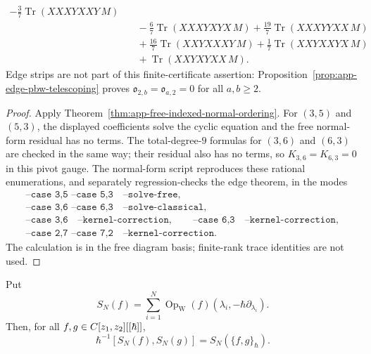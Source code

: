 \begin{prop}
\[\begin{aligned}
      -\frac{3}{7}\operatorname{Tr}(XXXYXXY\,M)\\
    &\quad
      -\frac{6}{7}\operatorname{Tr}(XXXYXYX\,M)
      +\frac{19}{7}\operatorname{Tr}(XXXYYXX\,M)\\
    &\quad
      +\frac{16}{7}\operatorname{Tr}(XXYXXXY\,M)
      +\frac{1}{7}\operatorname{Tr}(XXYXXYX\,M)\\
    &\quad
      +\operatorname{Tr}(XXYXYXX\,M).
  \end{aligned}
  \]
  Edge strips are not part of this finite-certificate assertion:
  Proposition~\ref{prop:app-edge-pbw-telescoping} proves
  \(\mathfrak o_{2,b}=\mathfrak o_{a,2}=0\) for all \(a,b\geq2\).
\end{prop}

\begin{proof}
  Apply Theorem~\ref{thm:app-free-indexed-normal-ordering}.  For
  \((3,5)\) and \((5,3)\), the displayed coefficients solve the cyclic
  equation and the free normal-form residual has no terms.  The
  total-degree-\(9\) formulas for \((3,6)\) and \((6,3)\) are checked in
  the same way; their residual also has no terms, so \(K_{3,6}=K_{6,3}=0\)
  in this pivot gauge.  The normal-form script reproduces these
  rational enumerations, and separately regression-checks the edge
  theorem, in the modes
  \[
  \begin{gathered}
    \texttt{--case 3,5 --case 5,3}\quad \texttt{--solve-free},\\
    \texttt{--case 3,6 --case 6,3}\quad
      \texttt{--solve-classical},\\
    \texttt{--case 3,6}\quad \texttt{--kernel-correction},\qquad
    \texttt{--case 6,3}\quad \texttt{--kernel-correction},\\
    \texttt{--case 2,7 --case 7,2}\quad
      \texttt{--kernel-correction}.
  \end{gathered}
  \]
  The calculation is in the free diagram basis; finite-rank trace
  identities are not used.
\end{proof}

\begin{lem}
\label{lem:app-radial-cartan-moyal-representation}
  Put
  \[
    S_N(f)=\sum_{i=1}^N
      \operatorname{Op}_{\mathrm W}
      (f)(\lambda_i,-\hbar\partial_{\lambda_i}).
  \]
  Then, for all \(f,g\in C[z_1,z_2][[\hbar]]\),
  \[
    \hbar^{-1}[S_N(f),S_N(g)]=S_N(\{f,g\}_\hbar).
  \]
\end{lem}

